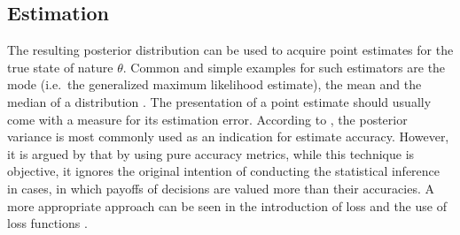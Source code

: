         \subsection{Estimation}
        The resulting posterior distribution can be used to acquire point estimates for the true state of nature $\theta$. Common and simple examples for such estimators are the mode (i.e.\ the generalized maximum likelihood estimate), the mean and the median of a distribution \citep{berger2013stat}. The presentation of a point estimate should usually come with a measure for its estimation error. According to \citet{berger2013stat}, the posterior variance is most commonly used as an indication for estimate accuracy. However, it is argued by \citet{davidson2015} that by using pure accuracy metrics, while this technique is objective, it ignores the original intention of conducting the statistical inference in cases, in which payoffs of decisions are valued more than their accuracies. A more appropriate approach can be seen in the introduction of loss and the use of loss functions \citep{davidson2015}.
        
